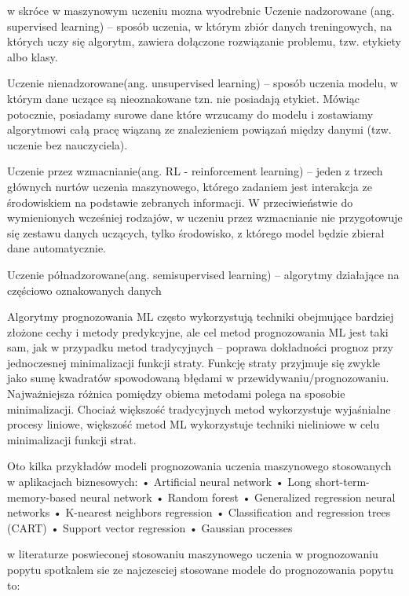 w skróce w maszynowym uczeniu mozna wyodrebnic
Uczenie nadzorowane (ang. supervised learning) – sposób uczenia, w którym zbiór danych treningowych, na których uczy się algorytm, zawiera dołączone rozwiązanie problemu, tzw. etykiety albo klasy. 

Uczenie nienadzorowane(ang. unsupervised learning) – sposób uczenia modelu, w którym dane uczące są nieoznakowane tzn. nie posiadają etykiet. Mówiąc potocznie, posiadamy surowe dane które wrzucamy do modelu i zostawiamy algorytmowi całą pracę wiązaną ze znalezieniem powiązań między danymi (tzw. uczenie bez nauczyciela).

Uczenie przez wzmacnianie(ang. RL - reinforcement learning) – jeden z trzech głównych nurtów uczenia maszynowego, którego zadaniem jest interakcja ze środowiskiem na podstawie zebranych informacji. W przeciwieństwie do wymienionych wcześniej rodzajów, w uczeniu przez wzmacnianie nie przygotowuje się zestawu danych uczących, tylko środowisko, z którego model będzie zbierał dane automatycznie. 

  Uczenie półnadzorowane(ang. semisupervised learning) – algorytmy działające na częściowo oznakowanych danych\cite{gove2023}

 Algorytmy prognozowania ML często wykorzystują techniki obejmujące bardziej złożone cechy i metody predykcyjne, ale cel metod prognozowania ML jest taki sam, jak w przypadku metod tradycyjnych – poprawa dokładności prognoz przy jednoczesnej minimalizacji funkcji straty. Funkcję straty przyjmuje się zwykle jako sumę kwadratów spowodowaną błędami w przewidywaniu/prognozowaniu. Najważniejsza różnica pomiędzy obiema metodami polega na sposobie minimalizacji. Chociaż większość tradycyjnych metod wykorzystuje wyjaśnialne procesy liniowe, większość metod ML wykorzystuje techniki nieliniowe w celu minimalizacji funkcji strat. 



Oto kilka przykładów modeli prognozowania uczenia maszynowego stosowanych w aplikacjach biznesowych:
    • Artificial neural network
    • Long short-term-memory-based neural network
    • Random forest
    • Generalized regression neural networks
    • K-nearest neighbors regression
    • Classification and regression trees (CART)
    • Support vector regression
    • Gaussian processes 
\cite{gen2023}


w literaturze poswieconej stosowaniu maszynowego uczenia w prognozowaniu popytu spotkalem sie ze najczesciej stosowane modele do prognozowania popytu to:

